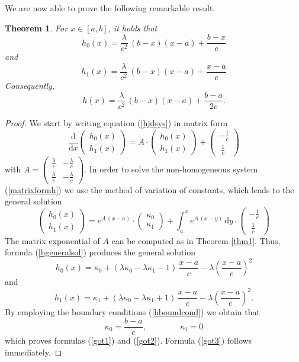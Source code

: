 \documentclass{article}
\newtheorem{thm}{Theorem}
\begin{document}
\noindent We are now able to prove the following remarkable result.
\begin{thm}\label{thm:fring}
For $x\in[a,b]$, it holds that
\begin{equation}\label{got1}h_0(x)=\frac{\lambda}{c^2}\,(b-x)(x-a)+\frac{b-x}{c}\end{equation}
and
\begin{equation}\label{got2}h_1(x)=\frac{\lambda}{c^2}\,(b-x)(x-a)+\frac{x-a}{c}\end{equation}
Consequently, \begin{equation}h(x)=\frac{\lambda}{c^2}\,(b-x)(x-a)+\frac{b-a}{2c}.\label{got3}\end{equation}
\end{thm}
\begin{proof}
We start by writing equation (\ref{hjdsys}) in matrix form
\begin{equation}\frac{\mathrm{d}}{\mathrm{d} x}\begin{pmatrix}h_0(x)\\[0.3em]h_1(x)\end{pmatrix}=A\cdot\begin{pmatrix}h_0(x)\\[0.3em]h_1(x)\end{pmatrix}+\begin{pmatrix}-\frac{1}{c}\\[0.3em]\;\frac{1}{c}\end{pmatrix}\label{matrixformh}\end{equation} with $A=\begin{pmatrix}\frac{\lambda}{c} & -\frac{\lambda}{c}\\[0.5em]\frac{\lambda}{c} & -\frac{\lambda}{c}\end{pmatrix}$. In order to solve the non-homogeneous system (\ref{matrixformh}) we use the method of variation of constants, which leads to the general solution
\begin{equation}\label{hgeneralsol}
\begin{pmatrix}h_0(x)\\[0.3em]h_1(x)\end{pmatrix}=e^{A\,(x-a)}\cdot\begin{pmatrix}\kappa_0\\[0.3em]\kappa_1\end{pmatrix}+\int_a^x e^{A\,(x-y)}\,\mathrm{d}y\cdot \begin{pmatrix}-\frac{1}{c}\\[0.3em]\;\frac{1}{c}\end{pmatrix}\end{equation} The matrix exponential of $A$ can be computed as in Theorem \ref{thm1}. Thus, formula (\ref{hgeneralsol}) produces the general solution 
$$h_0(x)=\kappa_0+(\lambda\kappa_0-\lambda\kappa_1-1)\,\frac{x-a}{c}-\lambda\left(\frac{x-a}{c}\right)^2$$
and
$$h_1(x)=\kappa_1+(\lambda\kappa_0-\lambda\kappa_1+1)\,\frac{x-a}{c}-\lambda\left(\frac{x-a}{c}\right)^2.$$
By employing the boundary conditions (\ref{hboundcond}) we obtain that
$$\kappa_0=\frac{b-a}{c},\qquad\qquad \kappa_1=0$$ which proves formulas (\ref{got1}) and (\ref{got2}). Formula (\ref{got3}) follows immediately.
\end{proof}
\end{document}
